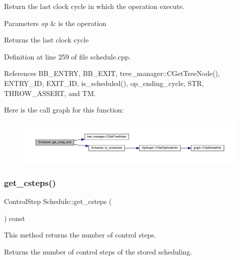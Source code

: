 Return the last clock cycle in which the operation execute. 


\begin{DoxyParams}{Parameters}
{\em op} & is the operation \\
\hline
\end{DoxyParams}
\begin{DoxyReturn}{Returns}
the last clock cycle 
\end{DoxyReturn}


Definition at line 259 of file schedule.\+cpp.



References B\+B\+\_\+\+E\+N\+T\+RY, B\+B\+\_\+\+E\+X\+IT, tree\+\_\+manager\+::\+C\+Get\+Tree\+Node(), E\+N\+T\+R\+Y\+\_\+\+ID, E\+X\+I\+T\+\_\+\+ID, is\+\_\+scheduled(), op\+\_\+ending\+\_\+cycle, S\+TR, T\+H\+R\+O\+W\+\_\+\+A\+S\+S\+E\+RT, and TM.

Here is the call graph for this function\+:
\nopagebreak
\begin{figure}[H]
\begin{center}
\leavevmode
\includegraphics[width=350pt]{df/d61/classSchedule_aadafc63bf5654bb1fe471923c7f7f763_cgraph}
\end{center}
\end{figure}
\mbox{\label{classSchedule_a698a0718e0f7097c70a85d90d1f56e97}} 
\subsubsection{\texorpdfstring{get\+\_\+csteps()}{get\_csteps()}}
{\footnotesize\ttfamily Control\+Step Schedule\+::get\+\_\+csteps (\begin{DoxyParamCaption}{ }\end{DoxyParamCaption}) const\hspace{0.3cm}{\ttfamily [inline]}}



This method returns the number of control steps. 

\begin{DoxyReturn}{Returns}
the number of control steps of the stored scheduling. 
\end{DoxyReturn}


